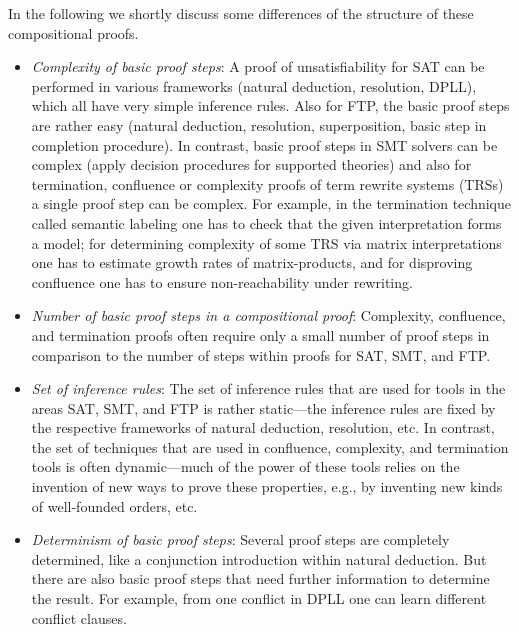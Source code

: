 \documentclass[USenglish]{eptcs}
\begin{document}
In the following we shortly discuss some differences of the structure
of these compositional proofs. 


\begin{itemize}
\item \emph{Complexity of basic proof steps}:
  A proof of unsatisfiability for SAT can be performed in various 
  frameworks (natural deduction, resolution, DPLL), 
  which all have very simple inference rules. 
  Also for FTP,
  the basic proof steps are rather easy (natural deduction, 
  resolution, superposition, basic step in completion procedure). 
  In contrast, basic proof steps in SMT solvers can be complex (apply decision procedures
  for supported theories) and also for termination, confluence or complexity proofs of 
  term rewrite systems (TRSs) a single
  proof step can be complex.
  For example, in the termination technique called semantic labeling \cite{Z95}
  one has to check that the given interpretation forms a model; for determining 
  complexity of some TRS via matrix interpretations \cite{EWZ08} one has to estimate
  growth rates of matrix-products, 
  and for disproving confluence one has to ensure non-reachability under rewriting. 

\item \emph{Number of basic proof steps in a compositional proof}:
  Complexity, confluence, and termination proofs often require only a small number
  of proof steps in comparison to the number of steps within proofs for SAT, SMT, and FTP.

\item \emph{Set of inference rules}:
  The set of inference rules that are used for tools in the 
  areas SAT, SMT, and FTP is rather static---the inference rules are 
  fixed by the
  respective frameworks of natural deduction, resolution, etc.
  In contrast, the set of techniques that are used in confluence, complexity, and termination tools 
  is often dynamic---much of the
  power of these tools relies on the invention of new ways to
  prove these properties, e.g., by inventing new kinds of well-founded orders, etc.
  
\item \emph{Determinism of basic proof steps}:
  Several proof steps are completely determined, like a conjunction introduction within 
  natural deduction. But there are also basic proof steps that need further
  information to determine the result. For example, from one conflict in DPLL one
  can learn different conflict clauses.
\end{itemize}
\end{document}
